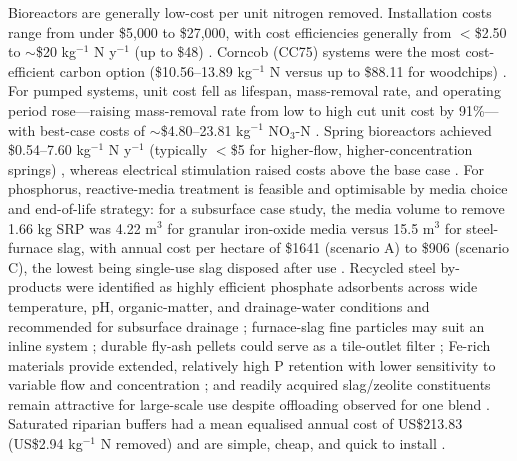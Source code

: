 \documentclass[11pt]{article}
\begin{document}
Bioreactors are generally low-cost per unit nitrogen removed. Installation costs range from under \$5{,}000 to \$27{,}000, with cost efficiencies generally from $<$\$2.50 to $\sim$\$20 kg$^{-1}$ N y$^{-1}$ (up to \$48) \parencite{Christianson2021}. Corncob (CC75) systems were the most cost-efficient carbon option (\$10.56--13.89 kg$^{-1}$ N versus up to \$88.11 for woodchips) \parencite{Law2023}. For pumped systems, unit cost fell as lifespan, mass-removal rate, and operating period rose---raising mass-removal rate from low to high cut unit cost by 91\%---with best-case costs of $\sim$\$4.80--23.81 kg$^{-1}$ NO$_3$-N \parencite{Hartfiel2024}. Spring bioreactors achieved \$0.54--7.60 kg$^{-1}$ N y$^{-1}$ (typically $<$\$5 for higher-flow, higher-concentration springs) \parencite{Easton2019}, whereas electrical stimulation raised costs above the base case \parencite{Law2018}. For phosphorus, reactive-media treatment is feasible and optimisable by media choice and end-of-life strategy: for a subsurface case study, the media volume to remove 1.66 kg SRP was 4.22 m$^3$ for granular iron-oxide media versus 15.5 m$^3$ for steel-furnace slag, with annual cost per hectare of \$1641 (scenario A) to \$906 (scenario C), the lowest being single-use slag disposed after use \parencite{Hauda2020}. Recycled steel by-products were identified as highly efficient phosphate adsorbents across wide temperature, pH, organic-matter, and drainage-water conditions and recommended for subsurface drainage \parencite{Sellner2019b}; furnace-slag fine particles may suit an inline system \parencite{Sanford2016}; durable fly-ash pellets could serve as a tile-outlet filter \parencite{Li2017}; Fe-rich materials provide extended, relatively high P retention with lower sensitivity to variable flow and concentration \parencite{Pugliese2023}; and readily acquired slag/zeolite constituents remain attractive for large-scale use despite offloading observed for one blend \parencite{Agrawal2011b}. Saturated riparian buffers had a mean equalised annual cost of US\$213.83 (US\$2.94 kg$^{-1}$ N removed) and are simple, cheap, and quick to install \parencite{Jaynes2019}.
\end{document}
